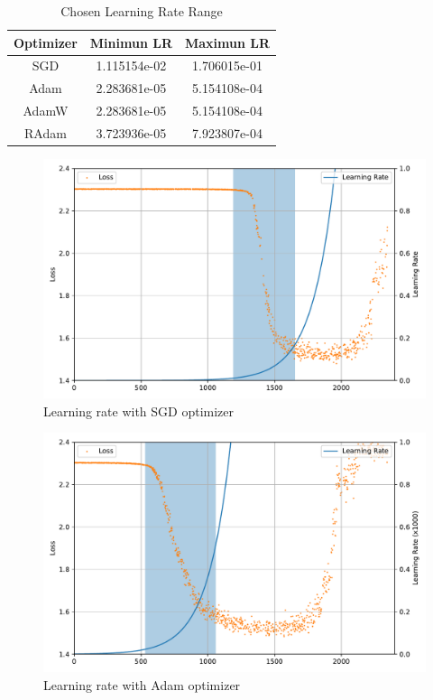 \documentclass{article}
\begin{document}
\begin{table}[ht!]
    \centering
    \caption{Chosen Learning Rate Range}\label{tab:lr_range}
    \begin{tabular}{ccc}
        \toprule
        Optimizer & Minimun LR   & Maximun LR   \\
        \midrule
        SGD       & 1.115154e-02 & 1.706015e-01 \\
        Adam      & 2.283681e-05 & 5.154108e-04 \\
        AdamW     & 2.283681e-05 & 5.154108e-04 \\
        RAdam     & 3.723936e-05 & 7.923807e-04 \\
        \bottomrule
    \end{tabular}
\end{table}

\begin{figure}[ht!]
    \centering
    \includegraphics[scale=0.64]{images/lr_range_sgd.pdf}
    \caption{Learning rate with SGD optimizer}\label{fig:lr_range_sgd}
\end{figure}

\begin{figure}[ht!]
    \centering
    \includegraphics[scale=0.64]{images/lr_range_adam.pdf}
    \caption{Learning rate with Adam optimizer}\label{fig:lr_range_adam}
\end{figure}
\end{document}
